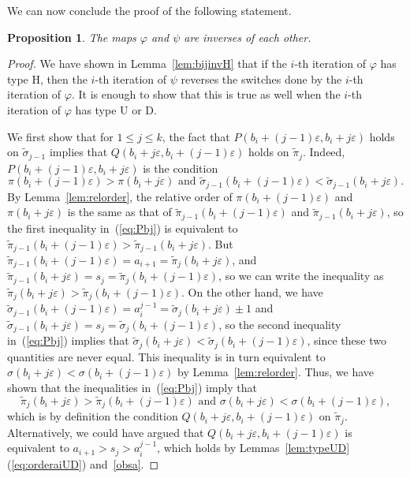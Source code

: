 \documentclass[11pt]{amsart}
\newtheorem{prop}[theorem]{Proposition}
\newcommand\beq{\begin{equation}}
\newcommand\eeq{\end{equation}}
\newcommand\wt{\widetilde}
\newcommand\bij{\varphi}
\newcommand\inv{\psi}
\newcommand\eps{\varepsilon}
\newcommand\sigm{\wt\sigma}
\newcommand\pim{\wt\pi}
\begin{document}
We can now conclude the proof of the following statement.

\begin{prop}\label{prop:inverses}
The maps $\bij$ and $\inv$ are inverses of each other.
\end{prop}

\begin{proof}
We have shown in Lemma~\ref{lem:bijinvH} that if the $i$-th iteration of $\bij$ has type H, then the $i$-th iteration of $\inv$ reverses the switches done by the $i$-th iteration of $\bij$.
It is enough to show that this is true as well when the $i$-th iteration of $\bij$ has type U or D.

We first show that for $1\le j\le k$, the fact that $P(b_i+(j{-}1)\eps,b_i+j\eps)$ holds on $\sigm_{j-1}$ implies that $Q(b_i+j\eps,b_i+(j-1)\eps)$ holds on $\pim_j$.
Indeed, $P(b_i+(j{-}1)\eps,b_i+j\eps)$ is the condition \beq\label{eq:Pbj}\pi(b_i+(j{-}1)\eps)>\pi(b_i+j\eps) \mbox{ and } \sigm_{j-1}(b_i+(j{-}1)\eps)<\sigm_{j-1}(b_i+j\eps).\eeq
By Lemma~\ref{lem:relorder}, the relative order of $\pi(b_i+(j{-}1)\eps)$ and $\pi(b_i+j\eps)$ is the same as that of $\pim_{j-1}(b_i+(j{-}1)\eps)$ and $\pim_{j-1}(b_i+j\eps)$, so
the first inequality in~(\ref{eq:Pbj}) is equivalent to $\pim_{j-1}(b_i+(j{-}1)\eps)>\pim_{j-1}(b_i+j\eps)$. But $\pim_{j-1}(b_i+(j{-}1)\eps)=a_{i+1}=\pim_j(b_i+j\eps)$, and $\pim_{j-1}(b_i+j\eps)=s_j=\pim_j(b_i+(j{-}1)\eps)$,
so we can write the inequality as $\pim_j(b_i+j\eps)>\pim_j(b_i+(j{-}1)\eps)$.
On the other hand, we have $\sigm_{j-1}(b_i+(j{-}1)\eps)=a_i^{j-1}=\sigm_{j}(b_i+j\eps)\pm1$ and $\sigm_{j-1}(b_i+j\eps)=s_j=\sigm_{j}(b_i+(j{-}1)\eps)$, so the second inequality in~(\ref{eq:Pbj})
implies that $\sigm_{j}(b_i+j\eps)<\sigm_{j}(b_i+(j{-}1)\eps)$, since these two quantities are never equal. This inequality is in turn equivalent to $\sigma(b_i+j\eps)<\sigma(b_i+(j{-}1)\eps)$
by Lemma~\ref{lem:relorder}. Thus, we have shown that the inequalities in~(\ref{eq:Pbj}) imply that
$$\pim_j(b_i+j\eps)>\pim_j(b_i+(j{-}1)\eps) \mbox{ and } \sigma(b_i+j\eps)<\sigma(b_i+(j{-}1)\eps),$$
which is by definition the condition $Q(b_i+j\eps,b_i+(j{-}1)\eps)$ on $\pim_j$. Alternatively, we could have argued that $Q(b_i+j\eps,b_i+(j{-}1)\eps)$ is equivalent to $a_{i+1}>s_j>a_i^{j-1}$, which holds by Lemmas~\ref{lem:typeUD}(\ref{eq:orderaiUD}) and~\ref{obsa}.


\end{proof}
\end{document}
